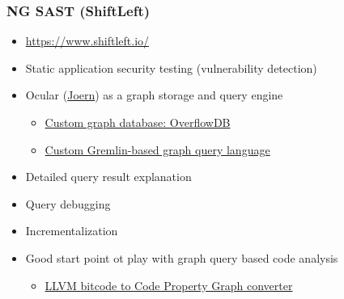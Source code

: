 \documentclass[xcolor=table,aspectratio=169]{beamer}
\begin{document}
\begin{frame}[fragile]
  \frametitle{NG SAST (ShiftLeft)} 
  \begin{minipage}[t]{0.48\textwidth}
  \begin{itemize}
    \item \url{https://www.shiftleft.io/}
    \item Static application security testing (vulnerability detection)
    \item Ocular (\href{https://joern.io/}{Joern}) as a graph storage and query engine
    \begin{itemize}
      \item \href{https://github.com/ShiftLeftSecurity/overflowdb}{Custom graph database: OverflowDB}
      \item \href{https://docs.joern.io/cpgql/reference-card}{Custom Gremlin-based graph query language}
    \end{itemize}
  \end{itemize}
\end{minipage}
\pause
\begin{minipage}[t]{0.48\textwidth}
  \begin{itemize}
    \item[\faQuestion] Detailed query result explanation
    \item[\faMinus] Query debugging
    \item[\faMinus] Incrementalization
  \end{itemize}
  \pause
  \begin{itemize}
    \item Good start point ot play with graph query based code analysis
    \begin{itemize}
      \item \href{https://github.com/ShiftLeftSecurity/llvm2cpg}{LLVM bitcode to Code Property Graph converter}
    \end{itemize}  
  \end{itemize}  
\end{minipage}
\end{frame}
\end{document}
